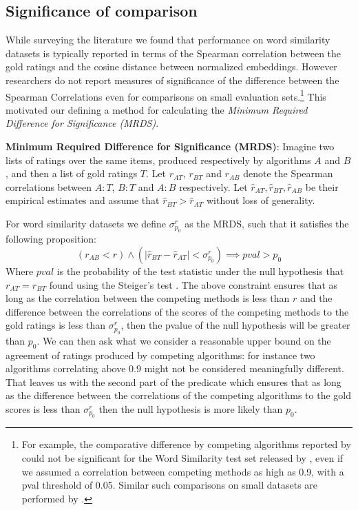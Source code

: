 \documentclass[11pt]{article}
\begin{document}
\subsection{Significance of comparison} \label{ssec:mrds}
While surveying the literature we found that performance on word
similarity datasets is typically reported in terms of the Spearman
correlation between the gold ratings and the cosine distance between
normalized embeddings.  However researchers do not report measures of
significance of the difference between the Spearman Correlations even
for comparisons on small evaluation sets.\footnote{For example, the
  comparative difference by competing algorithms reported by
   could not be significant for the
  Word Similarity test set released by
  , even if we assumed a correlation
  between competing methods as high as 0.9, with a pval threshold of
  0.05.  Similar such comparisons on small datasets are
  performed by .} This motivated our defining a
method for calculating the \emph{Minimum Required Difference for
  Significance (MRDS)}.

\noindent\textbf{Minimum Required Difference for Significance (MRDS)}:
Imagine two lists of ratings over the same items, produced
respectively by algorithms $A$ and $B$, and then a list of gold
ratings $T$. Let $r_{AT}$, $r_{BT}$ and $r_{AB}$ denote the Spearman
correlations between $A:T$, $B:T$ and $A:B$ respectively. Let
$\hat{r}_{AT}, \hat{r}_{BT}, \hat{r}_{AB}$ be their empirical
estimates and assume that $\hat{r}_{BT} > \hat{r}_{AT}$ without loss
of generality.

For word similarity datasets we define $\sigma_{p_0}^r$ as the MRDS,
such that it satisfies the following proposition: {\small $$ (r_{AB} <
  r) \land (|\hat{r}_{BT} - \hat{r}_{AT}|{<}\sigma_{p_0}^r) {\implies}
  \textit{pval} > p_0$$} Where $\textit{pval}$ is the probability of
the test statistic under the null hypothesis that $r_{AT} = r_{BT}$
found using the Steiger's test \cite{steiger1980tests}. The above
constraint ensures that as long as the correlation between the
competing methods is less than $r$ and the difference between the
correlations of the scores of the competing methods to the gold
ratings is less than $\sigma_{p_0}^r$, then the pvalue of the null
hypothesis will be greater than $p_0$.  We can then ask what we
consider a reasonable upper bound on the agreement of ratings produced
by competing algorithms: for instance two algorithms correlating above
$0.9$ might not be considered meaningfully different.  That leaves us
with the second part of the predicate which ensures that as long as
the difference between the correlations of the competing algorithms to
the gold scores is less than $\sigma_{p_0}^r$ then the null hypothesis
is more likely than $p_0$.
\end{document}
